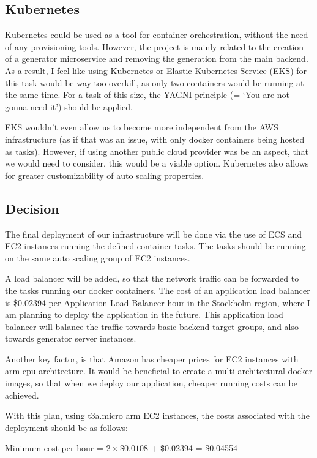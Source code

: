 	\subsection{Kubernetes}
		Kubernetes could be used as a tool for container orchestration, without the need of any provisioning tools. 
		However, the project is mainly related to the creation of a generator
		microservice and removing the generation from the main backend. As a result, I feel like using 
		Kubernetes or Elastic Kubernetes Service (EKS) for this task
		would be way too overkill, as only two containers would be running at the same time. 
		For a task of this size, the YAGNI principle (= `You are not gonna need it') should be applied.
		
		EKS wouldn't even allow us to become more independent
		from the AWS infrastructure (as if that was an issue, with only docker containers being hosted as tasks). However, if using another 
		public cloud provider was be an aspect, that we would need to consider, this would be a viable option. Kubernetes also allows for 
		greater customizability of auto scaling properties.

	\subsection{Decision} \label{awsdecision}
		The final deployment of our infrastructure will be done via the use of ECS and EC2 instances running the defined container tasks.
		The tasks should be running on the same auto scaling group of EC2 instances. 
		
		A load balancer will be added, so that the 
		network traffic can be forwarded to the tasks running our docker containers. The cost of an application load balancer is \$0.02394 per Application 
		Load Balancer-hour in the Stockholm region, where I am planning to deploy the application in the future. This application load balancer
		will balance the traffic towards basic backend target groups, and also towards generator server instances.

		Another key factor, is that Amazon has cheaper prices for EC2 instances with arm cpu architecture. It would be beneficial
		to create a multi-architectural docker images, so that when we deploy our application, cheaper running costs can be 
		achieved.

		With this plan, using t3a.micro arm EC2 instances, the costs associated with the deployment should be as follows:
		
		\begin{center}
			Minimum cost per hour = $2 \times \$0.0108$ + \$0.02394 = \$0.04554
		\end{center}

